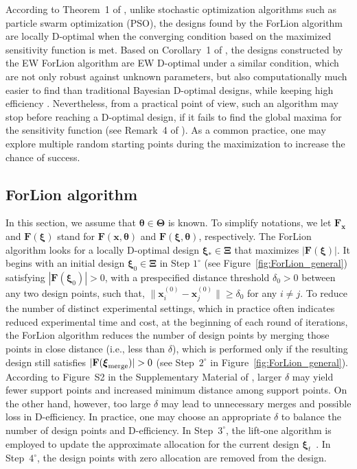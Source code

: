 According to Theorem~1 of \cite{huang2024forlion}, unlike stochastic optimization algorithms such as particle swarm optimization (PSO), the designs found by the ForLion algorithm are locally D-optimal when the converging condition based on the maximized sensitivity function is met. Based on Corollary~1 of \cite{lin2025ew}, the designs constructed by the EW ForLion algorithm are EW D-optimal under a similar condition, which are not only robust against unknown parameters, but also computationally much easier to find than traditional Bayesian D-optimal designs, while keeping high efficiency \citep{ymm2016, ytm2016, bu2020, lin2025ew}. Nevertheless, from a practical point of view, such an algorithm may stop before reaching a D-optimal design, if it fails to find the global maxima for the sensitivity function (see Remark~4 of \cite{huang2024forlion}). As a common practice, one may explore multiple random starting points during the maximization to increase the chance of success.

\subsection{ForLion algorithm} \label{sec:ForLion algorithms}

In this section, we assume that $\boldsymbol{\theta} \in \boldsymbol{\Theta}$ is known. To simplify notations, we let ${\mathbf F}_{\mathbf x}$ and ${\mathbf F}(\boldsymbol{\xi})$ stand for ${\mathbf F}({\mathbf x}, \boldsymbol{\theta})$ and ${\mathbf F}(\boldsymbol{\xi}, \boldsymbol{\theta})$, respectively. The ForLion algorithm looks for a locally D-optimal design $\boldsymbol{\xi}_* \in \boldsymbol{\Xi}$ that maximizes $|{\mathbf F}(\boldsymbol\xi)|$.  It begins with an initial design $\boldsymbol{\xi}_0 \in \boldsymbol{\Xi}$ in Step $1^\circ$ (see Figure~\ref{fig:ForLion_general}) satisfying $|{\mathbf{F}}({\boldsymbol{\xi}}_0)| > 0$, with a prespecified distance threshold $\delta_{0} > 0$ between any two design points, such that, $\|{\mathbf{x}}_i^{(0)} - {\mathbf{x}}_j^{(0)}\| \geq \delta_{0}$ for any $i \neq j$. To reduce the number of distinct experimental settings, which in practice often indicates reduced experimental time and cost, at the beginning of each round of iterations, the ForLion algorithm reduces the number of design points by merging those points in close distance (i.e., less than $\delta$), which is performed only if the resulting design still satisfies $|{\mathbf{F}}({\boldsymbol{\xi}}_{\rm merge})|>0$ (see Step~$2^\circ$ in Figure~\ref{fig:ForLion_general}). According to Figure~S2 in the Supplementary Material of \cite{huang2024forlion}, larger $\delta$ may yield fewer support points and increased minimum distance among support points. On the other hand, however, too large $\delta$ may lead to unnecessary merges and possible loss in D-efficiency. In practice, one may choose an appropriate $\delta$ to balance the number of design points and D-efficiency. In Step~$3^\circ$, the lift-one algorithm \citep{ym2015, ymm2016, huang2025constrained} is employed to update the approximate allocation for the current design $\boldsymbol{\xi}_t$~. In Step~$4^\circ$, the design points with zero allocation are removed from the design.


